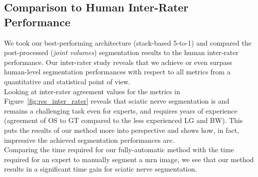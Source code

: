 \subsection{Comparison to Human Inter-Rater Performance}
We took our best-performing architecture (stack-based 5-to-1) and compared the post-processed (\textit{joint volumes}) segmentation results to the human inter-rater performance. Our inter-rater study reveals that we achieve or even surpass human-level segmentation performances with respect to all metrics from a quantitative and statistical point of view.\\
Looking at inter-rater agreement values for the metrics in Figure~\ref{fig:res_inter_rater} reveals that sciatic nerve segmentation is and remains a challenging task even for experts, and requires years of experience (agreement of OS to GT compared to the less experienced LG and BW). This puts the results of our method more into perspective and shows how, in fact, impressive the achieved segmentation performances are.\\
Comparing the time required for our fully-automatic method with the time required for an expert to manually segment a \gls{mrn} image, we see that our method results in a significant time gain for sciatic nerve segmentation.\\


